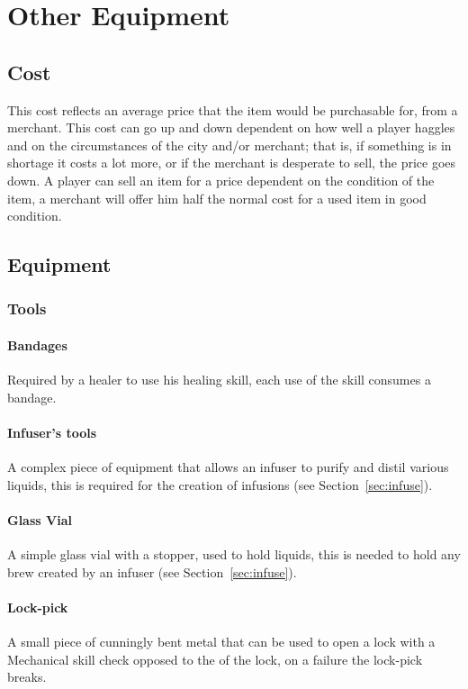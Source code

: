 \documentclass[a4paper,11pt,oneside]{book}
\newcommand{\textlf}[1]{\textbf{\titlecap{#1}}}
\begin{document}
\chapter{Other Equipment}


\section{Cost}
This cost reflects an average price that the item would be purchasable for, from a merchant. This cost can go up and down dependent on how well a player haggles and on the circumstances of the city and/or merchant; that is, if something is in shortage it costs a lot more, or if the merchant is desperate to sell, the price goes down. A player can sell an item for a price dependent on the condition of the item, a merchant will offer him half the normal cost for a used item in good condition.

\section{Equipment}
\subsection{Tools}

\subsubsection*{Bandages}
Required by a healer to use his healing skill, each use of the skill consumes a bandage.

\subsubsection*{Infuser's tools}
A complex piece of equipment that allows an infuser to purify and distil various liquids, this is required for the creation of infusions (see Section~\ref{sec:infuse}).

\subsubsection*{Glass Vial}
A simple glass vial with a stopper, used to hold liquids, this is needed to hold any brew created by an infuser (see Section~\ref{sec:infuse}).

\subsubsection*{Lock-pick}
A small piece of cunningly bent metal that can be used to open a lock with a Mechanical skill check opposed to the \textlf{difficulty} of the lock, on a failure the lock-pick breaks.
\end{document}
